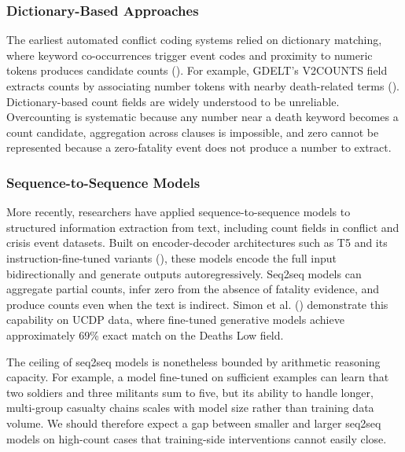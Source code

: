 \documentclass[
  11pt,
]{article}
\begin{document}
\subsubsection{Dictionary-Based
Approaches}\label{dictionary-based-approaches}

The earliest automated conflict coding systems relied on dictionary
matching, where keyword co-occurrences trigger event codes and proximity
to numeric tokens produces candidate counts
(). For example,
GDELT's V2COUNTS field extracts counts by associating number tokens with
nearby death-related terms (). Dictionary-based count fields are widely understood to
be unreliable. Overcounting is systematic because any number near a
death keyword becomes a count candidate, aggregation across clauses is
impossible, and zero cannot be represented because a zero-fatality event
does not produce a number to extract.

\subsubsection{Sequence-to-Sequence
Models}\label{sequence-to-sequence-models}

More recently, researchers have applied sequence-to-sequence models to
structured information extraction from text, including count fields in
conflict and crisis event datasets. Built on encoder-decoder
architectures such as T5 and its instruction-fine-tuned variants
(), these models encode the
full input bidirectionally and generate outputs autoregressively.
Seq2seq models can aggregate partial counts, infer zero from the absence
of fatality evidence, and produce counts even when the text is indirect.
Simon et al. () demonstrate this
capability on UCDP data, where fine-tuned generative models achieve
approximately 69\% exact match on the Deaths Low field.

The ceiling of seq2seq models is nonetheless bounded by arithmetic
reasoning capacity. For example, a model fine-tuned on sufficient
examples can learn that two soldiers and three militants sum to five,
but its ability to handle longer, multi-group casualty chains scales
with model size rather than training data volume. We should therefore
expect a gap between smaller and larger seq2seq models on high-count
cases that training-side interventions cannot easily close.
\end{document}
